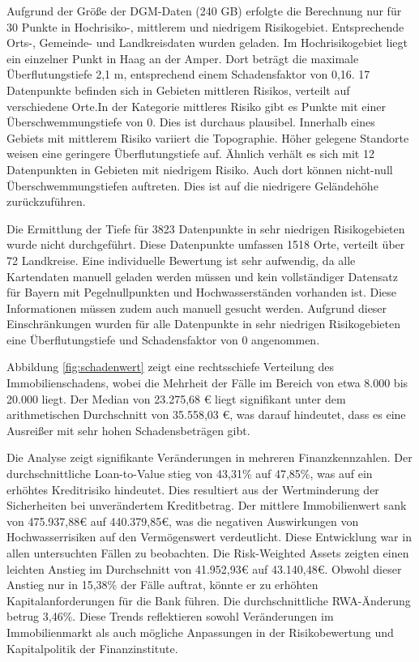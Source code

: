 Aufgrund der Größe der \ac{DGM}-Daten (240 GB) erfolgte die Berechnung nur für 30 Punkte in Hochrisiko-, mittlerem und niedrigem Risikogebiet. Entsprechende Orts-, Gemeinde- und Landkreisdaten wurden geladen.
Im Hochrisikogebiet liegt ein einzelner Punkt in Haag an der Amper. Dort beträgt die maximale Überflutungstiefe 2,1 m, entsprechend einem Schadensfaktor von 0,16.
17 Datenpunkte befinden sich in Gebieten mittleren Risikos, verteilt auf verschiedene Orte.In der Kategorie mittleres Risiko gibt es Punkte mit einer Überschwemmungstiefe von 0. Dies ist durchaus plausibel. Innerhalb eines Gebiets mit mittlerem Risiko variiert die Topographie. Höher gelegene Standorte weisen eine geringere Überflutungstiefe auf. Ähnlich verhält es sich mit 12 Datenpunkten in Gebieten mit niedrigem Risiko. Auch dort können nicht-null Überschwemmungstiefen auftreten. Dies ist auf die niedrigere Geländehöhe zurückzuführen. 

Die Ermittlung der Tiefe für 3823 Datenpunkte in sehr niedrigen Risikogebieten wurde nicht durchgeführt. Diese Datenpunkte umfassen 1518 Orte, verteilt über 72 Landkreise. Eine individuelle Bewertung ist sehr aufwendig, da alle Kartendaten manuell geladen werden müssen und kein vollständiger Datensatz für Bayern mit Pegelnullpunkten und Hochwasserständen vorhanden ist. Diese Informationen müssen zudem auch manuell gesucht werden. Aufgrund dieser Einschränkungen wurden für alle Datenpunkte in sehr niedrigen Risikogebieten eine Überflutungstiefe und Schadensfaktor von 0 angenommen.

Abbildung \ref{fig:schadenwert} zeigt eine rechtsschiefe Verteilung des Immobilienschadens, wobei die Mehrheit der Fälle im Bereich von etwa 8.000 bis 20.000 liegt. Der Median von 23.275,68 € liegt signifikant unter dem arithmetischen Durchschnitt von 35.558,03 €, was darauf hindeutet, dass es eine Ausreißer mit sehr hohen Schadensbeträgen gibt.

Die Analyse zeigt signifikante Veränderungen in mehreren Finanzkennzahlen. Der durchschnittliche Loan-to-Value stieg von 43,31\% auf 47,85\%, was auf ein erhöhtes Kreditrisiko hindeutet. Dies resultiert aus der Wertminderung der Sicherheiten bei unverändertem Kreditbetrag. Der mittlere Immobilienwert sank von 475.937,88€ auf 440.379,85€, was die negativen Auswirkungen von Hochwasserrisiken auf den Vermögenswert verdeutlicht. Diese Entwicklung war in allen untersuchten Fällen zu beobachten. Die Risk-Weighted Assets zeigten einen leichten Anstieg im Durchschnitt von 41.952,93€ auf 43.140,48€. Obwohl dieser Anstieg nur in 15,38\% der Fälle auftrat, könnte er zu erhöhten Kapitalanforderungen für die Bank führen. Die durchschnittliche RWA-Änderung betrug 3,46\%. Diese Trends reflektieren sowohl Veränderungen im Immobilienmarkt als auch mögliche Anpassungen in der Risikobewertung und Kapitalpolitik der Finanzinstitute.